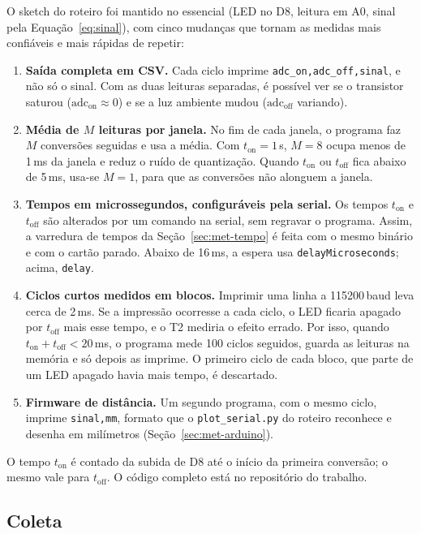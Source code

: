 \documentclass[11pt,a4paper]{article}
\begin{document}
O sketch do roteiro foi mantido no essencial (LED no D8, leitura em A0, sinal pela Equação~\eqref{eq:sinal}), com cinco mudanças que tornam as medidas mais confiáveis e mais rápidas de repetir:
\begin{enumerate}[nosep]
  \item \textbf{Saída completa em CSV.} Cada ciclo imprime \texttt{adc\_on,adc\_off,sinal}, e não só o sinal. Com as duas leituras separadas, é possível ver se o transistor saturou ($\text{adc}_\text{on} \approx 0$) e se a luz ambiente mudou ($\text{adc}_\text{off}$ variando).
  \item \textbf{Média de $M$ leituras por janela.} No fim de cada janela, o programa faz $M$ conversões seguidas e usa a média. Com $t_\text{on} = 1$\,s, $M = 8$ ocupa menos de 1\,ms da janela e reduz o ruído de quantização. Quando $t_\text{on}$ ou $t_\text{off}$ fica abaixo de 5\,ms, usa-se $M = 1$, para que as conversões não alonguem a janela.
  \item \textbf{Tempos em microssegundos, configuráveis pela serial.} Os tempos $t_\text{on}$ e $t_\text{off}$ são alterados por um comando na serial, sem regravar o programa. Assim, a varredura de tempos da Seção~\ref{sec:met-tempo} é feita com o mesmo binário e com o cartão parado. Abaixo de 16\,ms, a espera usa \texttt{delayMicroseconds}; acima, \texttt{delay}.
  \item \textbf{Ciclos curtos medidos em blocos.} Imprimir uma linha a 115200\,baud leva cerca de 2\,ms. Se a impressão ocorresse a cada ciclo, o LED ficaria apagado por $t_\text{off}$ mais esse tempo, e o T2 mediria o efeito errado. Por isso, quando $t_\text{on} + t_\text{off} < 20$\,ms, o programa mede 100 ciclos seguidos, guarda as leituras na memória e só depois as imprime. O primeiro ciclo de cada bloco, que parte de um LED apagado havia mais tempo, é descartado.
  \item \textbf{Firmware de distância.} Um segundo programa, com o mesmo ciclo, imprime \texttt{sinal,mm}, formato que o \texttt{plot\_serial.py} do roteiro reconhece e desenha em milímetros (Seção~\ref{sec:met-arduino}).
\end{enumerate}
O tempo $t_\text{on}$ é contado da subida de D8 até o início da primeira conversão; o mesmo vale para $t_\text{off}$. O código completo está no repositório do trabalho.

\subsection{Coleta}
\label{sec:met-coleta}
\end{document}

